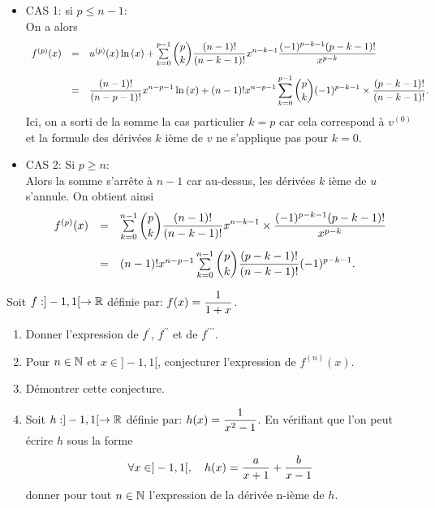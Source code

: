 \documentclass[a4paper, 11pt,reqno]{article}
\begin{document}
\begin{correction}
\begin{enumerate}
\begin{itemize}
			            \begin{itemize}
				            \item CAS 1: si $p\leq n-1$:\\
				                  \noindent On a alors
				                  $$\begin{array}{lll}
						                  f^{(p)}(x) & = & u^{(p)}(x)\ln{(x)}+\sum\limits_{k=0}^{p-1} \ddp \binom{p}{k} \ddp\frac{(n-1)!}{(n-k-1)!}x^{n-k-1}\ddp\frac{(-1)^{p-k-1} (p-k-1)!}{x^{p-k}}\vsec          \\
						                             & = & \ddp\frac{(n-1)!}{(n-p-1)!}x^{n-p-1}\ln{(x)}+ (n-1)!x^{n-p-1}\sum\limits_{k=0}^{p-1} \ddp \binom{p}{k} (-1)^{p-k-1}\times\ddp\frac{ (p-k-1)!}{(n-k-1)!}.
					                  \end{array}$$
				                  Ici, on a sorti de la somme la cas particulier $k=p$ car cela correspond \`a $v^{(0)}$ et la formule des d\'eriv\'ees $k$ i\`eme de $v$ ne s'applique pas pour $k=0$.
				            \item CAS 2: Si $p\geq n$:\\
				                  Alors la somme s'arr\^ete \`a $n-1$ car au-dessus, les d\'eriv\'ees $k$ i\`eme de $u$ s'annule. On obtient ainsi
				                  $$\begin{array}{lll}
						                  f^{(p)}(x) & = & \sum\limits_{k=0}^{n-1}\ddp \binom{p}{k} \ddp\frac{(n-1)!}{(n-k-1)!}x^{n-k-1}\times \ddp\frac{(-1)^{p-k-1} (p-k-1)!}{x^{p-k}}\vsec \\
						                             & = & (n-1)! x^{n-p-1}\sum\limits_{k=0}^{n-1}\ddp \binom{p}{k} \ddp\frac{(p-k-1)!}{(n-k-1)!} (-1)^{p-k-1}.
					                  \end{array}$$
			            \end{itemize}
		      \end{itemize}
	\end{enumerate}
\end{correction}
\begin{exercice}
	Soit $f: \rbrack -1,1\lbrack\rightarrow \mathbb{R}$ d\'efinie par: $f(x)=\displaystyle\frac{1}{1+x}$.
	\begin{enumerate}
		\item Donner l'expression de $f^{\prime}$, $f^{\prime\prime}$ et de $f^{\prime\prime\prime}$.
		\item Pour $n\in\mathbb{N}$ et $x\in\rbrack -1,1\lbrack$, conjecturer l'expression de $f^{(n)}(x)$.
		\item D\'emontrer cette conjecture.
		\item
		      Soit $h: \rbrack -1,1\lbrack\rightarrow\mathbb{R}$ d\'efinie par: $h(x)=\displaystyle\frac{1}{x^2-1}$. En v\'erifiant que l'on peut \'ecrire $h$ sous la forme
		      $$\forall x\in\rbrack -1,1\lbrack,\quad h(x)=\displaystyle\frac{a}{x+1}+\displaystyle\frac{b}{x-1}$$
		      donner pour tout $n\in\mathbb{N}$ l'expression de la d\'eriv\'ee n-i\`eme de $h$.
	\end{enumerate}
\end{exercice}
\end{document}
